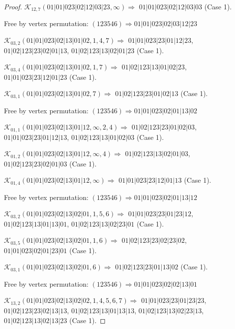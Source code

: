 \documentclass[12pt]{article}
\theoremstyle{plain}
\theoremstyle{definition}
\theoremstyle{remark}
\newcommand{\fancy}[1]{\mathcal{#1}}
\def\K{\fancy{K}}
\begin{document}
\begin{proof}
	$\K_{12,7}(01|01|023|02|12|03|23,\infty)\Rightarrow $ $01|01|023|02|12|03|03$ (Case 1).
	
	
	
	Free by vertex permutation: $(1 2 3 5 4 6)\Rightarrow 01|01|023|02|03|12|23$
	
	
	
	\bigskip
	
	$\K_{03,2}(01|01|023|02|13|01|02,1, 4, 7)\Rightarrow $ $01|01|023|23|01|12|23$, $01|02|123|23|02|01|13$, $01|02|123|13|02|01|23$ (Case 1).
	
	$\K_{03,4}(01|01|023|02|13|01|02,1, 7)\Rightarrow $ $01|02|123|13|01|02|23$, $01|01|023|23|12|01|23$ (Case 1).
	
	$\K_{03,1}(01|01|023|02|13|01|02,7)\Rightarrow $ $01|02|123|23|01|02|13$ (Case 1).
	
	
	
	Free by vertex permutation: $(1 2 3 5 4 6)\Rightarrow 01|01|023|02|01|13|02$
	
	
	
	\bigskip
	
	$\K_{01,1}(01|01|023|02|13|01|12,\infty,2, 4)\Rightarrow $ $01|02|123|23|01|02|03$, $01|01|023|23|01|12|13$, $01|02|123|13|01|02|03$ (Case 1).
	
	$\K_{01,2}(01|01|023|02|13|01|12,\infty,4)\Rightarrow $ $01|02|123|13|02|01|03$, $01|02|123|23|02|01|03$ (Case 1).
	
	$\K_{01,4}(01|01|023|02|13|01|12,\infty)\Rightarrow $ $01|01|023|23|12|01|13$ (Case 1).
	
	
	
	Free by vertex permutation: $(1 2 3 5 4 6)\Rightarrow 01|01|023|02|01|13|12$
	
	
	
	\bigskip
	
	$\K_{03,2}(01|01|023|02|13|02|01,1, 5, 6)\Rightarrow $ $01|01|023|23|01|23|12$, $01|02|123|13|01|13|01$, $01|02|123|13|02|23|01$ (Case 1).
	
	$\K_{03,5}(01|01|023|02|13|02|01,1, 6)\Rightarrow $ $01|02|123|23|02|23|02$, $01|01|023|02|01|23|01$ (Case 1).
	
	$\K_{03,1}(01|01|023|02|13|02|01,6)\Rightarrow $ $01|02|123|23|01|13|02$ (Case 1).
	
	
	
	Free by vertex permutation: $(1 2 3 5 4 6)\Rightarrow 01|01|023|02|02|13|01$
	
	
	
	\bigskip
	
	$\K_{13,2}(01|01|023|02|13|02|02,1, 4, 5, 6, 7)\Rightarrow $ $01|01|023|23|01|23|23$, $01|02|123|23|02|13|13$, $01|02|123|13|01|13|13$, $01|02|123|13|02|23|13$, $01|02|123|13|02|13|23$ (Case 1).
	

\end{proof}
\end{document}
